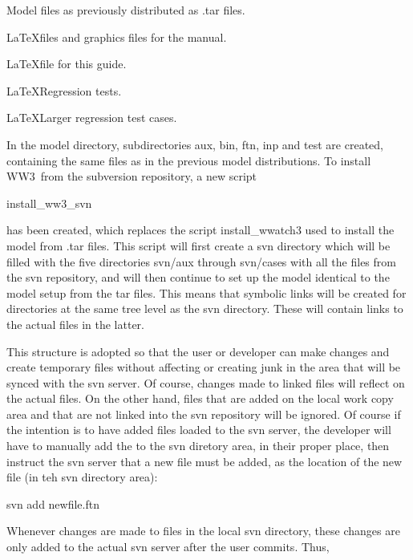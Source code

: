 \documentclass[12pt]{article}
\newcommand{\ws}{WW3}
\newcommand{\file}{\sf}
\newenvironment{flist}{\begin{list}{nofile ?}{\parsep 0mm
            \itemsep 0mm \leftmargin 35mm \labelwidth 25mm
            \rightmargin 10mm}}{\end{list}}
\newcommand{\fit}[2]{\item[{\file{#1}}\hfill]{#2}}
\begin{document}
\begin{flist}
\fit{model    }{Model files as previously distributed as {\file .tar} files.}
\fit{manual   }{\LaTeX files and graphics files for the manual.}
\fit{guide    }{\LaTeX file for this guide.}
\fit{regtests }{\LaTeX Regression tests.}
\fit{cases    }{\LaTeX Larger regression test cases.}
\end{flist}

\noindent
In the {\file model} directory, subdirectories {\file aux}, {\file bin},
{\file ftn}, {\file inp} and {\file test} are created, containing the same
files as in the previous model distributions. To install \ws\ from the
subversion repository, a new script

\vspace{\baselineskip}
\centerline{\file install\_ww3\_svn}
\vspace{\baselineskip}

\noindent
has been created, which replaces the script {\file install\_wwatch3} used to
install the model from {\file .tar} files. This script will first create a svn
directory which will be filled with the
five directories {\file svn/aux} through {\file svn/cases} with all the files
from the svn repository, and will then continue to set up the model identical
to the model setup from the tar files. This means that symbolic links will be 
created for directories at the same tree level as the svn directory. These will contain
links to the actual files in the latter. 

This structure is adopted so that the user
or developer can make changes and create temporary files without affecting or creating
junk in the area that will be synced with the svn server. Of course, changes made to linked
files will reflect on the actual files. On the other hand, files that are added on the
local work copy area and that are not linked into the svn repository will be ignored.
Of course if the intention is to have added files loaded to the svn server, the developer 
will have to manually add the to the svn diretory area, in their proper place, then instruct 
the svn server that a new file must be added, as the location of the new file (in teh svn directory
area):

\vspace{\baselineskip}
\centerline{\file svn add newfile.ftn}
\vspace{\baselineskip}

Whenever changes are made to files in the local svn directory, these changes are only added
to the actual svn server after the user commits. Thus,
\end{document}
